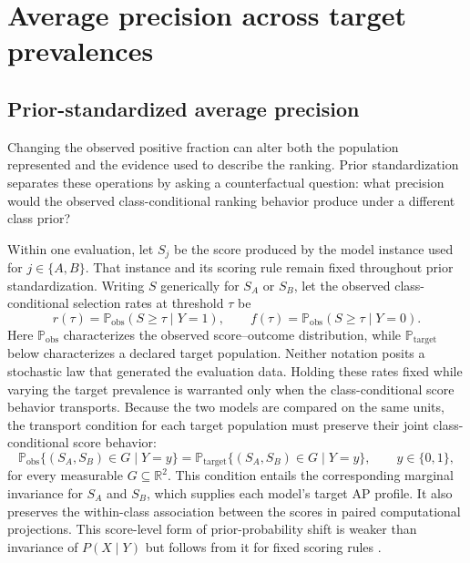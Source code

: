 \documentclass[11pt]{article}
\newcommand{\Prb}{\mathbb{P}}
\theoremstyle{remark}
\begin{document}
\section{Average precision across target prevalences}
\label{sec:prevalence}

\subsection{Prior-standardized average precision}

Changing the observed positive fraction can alter both the population represented and the evidence used to describe the ranking. Prior standardization separates these operations by asking a counterfactual question: what precision would the observed class-conditional ranking behavior produce under a different class prior?

Within one evaluation, let $S_j$ be the score produced by the model instance used for $j\in\{A,B\}$. That instance and its scoring rule remain fixed throughout prior standardization. Writing $S$ generically for $S_A$ or $S_B$, let the observed class-conditional selection rates at threshold $\tau$ be
\[
r(\tau)=\Prb_{\mathrm{obs}}(S\geq \tau\mid Y=1),
\qquad
f(\tau)=\Prb_{\mathrm{obs}}(S\geq \tau\mid Y=0).
\]
Here $\Prb_{\mathrm{obs}}$ characterizes the observed score--outcome
distribution, while $\Prb_{\mathrm{target}}$ below characterizes a declared
target population. Neither notation posits a stochastic law that generated the
evaluation data.
Holding these rates fixed while varying the target prevalence is warranted only when the class-conditional score behavior transports. Because the two models are compared on the same units, the transport condition for each target population must preserve their joint class-conditional score behavior:
\begin{equation}
\Prb_{\mathrm{obs}}\{(S_A,S_B)\in G\mid Y=y\}
=
\Prb_{\mathrm{target}}\{(S_A,S_B)\in G\mid Y=y\},
\qquad y\in\{0,1\},
\label{eq:score-invariance}
\end{equation}
for every measurable $G\subseteq\mathbb R^2$. This condition entails the corresponding marginal invariance for $S_A$ and $S_B$, which supplies each model's target AP profile. It also preserves the within-class association between the scores in paired computational projections. This score-level form of prior-probability shift is weaker than invariance of $P(X\mid Y)$ but follows from it for fixed scoring rules \cite{saerens2002adjusting,storkey2009training,lipton2018detecting}.
\end{document}
